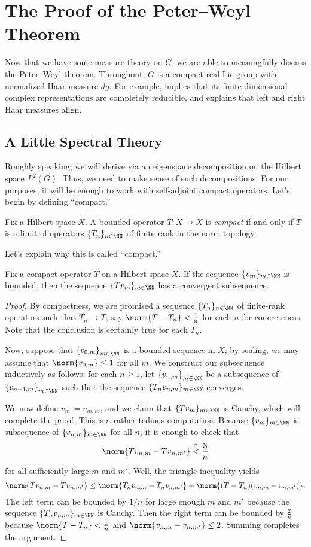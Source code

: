 \documentclass{amsart}
\begin{document}
\section{The Proof of the Peter--Weyl Theorem} \label{sec:pw}
Now that we have some measure theory on $G$, we are able to meaningfully discuss the Peter--Weyl theorem. Throughout, $G$ is a compact real Lie group with normalized Haar measure $dg$. For example,  implies that its finite-dimensional complex representations are completely reducible, and  explains that left and right Haar measures align.

\subsection{A Little Spectral Theory}
Roughly speaking, we will derive  via an eigenspace decomposition on the Hilbert space $L^2(G)$. Thus, we need to make sense of such decompositions. For our purposes, it will be enough to work with self-adjoint compact operators. Let's begin by defining ``compact.''
\begin{definition}[compact]
	Fix a Hilbert space $X$. A bounded operator $T\colon X\to X$ is \textit{compact} if and only if $T$ is a limit of operators $\{T_n\}_{n\in\NN}$ of finite rank in the norm topology.
\end{definition}
Let's explain why this is called ``compact.''
\begin{lemma} \label{lem:compact-gives-convergence}
	Fix a compact operator $T$ on a Hilbert space $X$. If the sequence $\{v_m\}_{m\in\NN}$ is bounded, then the sequence $\{Tv_m\}_{m\in\NN}$ has a convergent subsequence.
\end{lemma}
\begin{proof}
	By compactness, we are promised a sequence $\{T_n\}_{n\in\NN}$ of finite-rank operators such that $T_n\to T$; say $\norm{T-T_n}<\frac1n$ for each $n$ for concreteness. Note that the conclusion is certainly true for each $T_n$.

	Now, suppose that $\left\{v_{0,m}\right\}_{m\in\NN}$ is a bounded sequence in $X$; by scaling, we may assume that $\norm{v_{0,m}}\le1$ for all $m$. We construct our subsequence inductively as follows: for each $n\ge1$, let $\left\{v_{n,m}\right\}_{m\in\NN}$ be a subsequence of $\left\{v_{n-1,m}\right\}_{m\in\NN}$ such that the sequence $\{T_nv_{n,m}\}_{m\in\NN}$ converges.
	
	We now define $v_m\coloneqq v_{m,m}$, and we claim that $\{Tv_m\}_{m\in\NN}$ is Cauchy, which will complete the proof. This is a rather tedious computation. Because $\{v_m\}_{m\in\NN}$ is subsequence of $\{v_{n,m}\}_{m\in\NN}$ for all $n$, it is enough to check that
	\[\norm{Tv_{n,m}-Tv_{n,m'}}\stackrel?<\frac3n\]
	for all sufficiently large $m$ and $m'$. Well, the triangle inequality yields
	\[\norm{Tv_{n,m}-Tv_{n,m'}}\le\norm{T_nv_{n,m}-T_nv_{n,m'}}+\norm{(T-T_n)(v_{n,m}-v_{n,m'})}.\]
	The left term can be bounded by $1/n$ for large enough $m$ and $m'$ because the sequence $\{T_nv_{n,m}\}_{m\in\NN}$ is Cauchy. Then the right term can be bounded by $\frac2n$ because $\norm{T-T_n}<\frac1n$ and $\norm{v_{n,m}-v_{n,m'}}\le2$. Summing completes the argument.
\end{proof}
\end{document}
